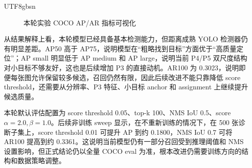 \documentclass[11pt,a4paper]{article}
\begin{document}
\begin{CJK*}{UTF8}{gbsn}
\begin{figure}[H]
\centering
{}
\caption{本轮实验 COCO AP/AR 指标可视化}
\end{figure}

从结果解释上看，本轮模型已经具备基本检测能力，但距离成熟 YOLO 检测器仍有明显差距。AP50 高于 AP75，说明模型在“粗略找到目标”方面优于“高质量定位”；AP small 明显低于 AP medium 和 AP large，说明当前 P4/P5 双尺度结构对小目标不够友好，这也是后续增加 P3 的直接动机。AR100 为 0.3023，说明即便每张图允许保留较多候选，召回仍然有限，因此后续改进不能只靠降低 score threshold，还需要从分辨率、P3 特征、小目标 anchor 和 assignment 上继续提升候选质量。

本轮默认评估配置为 score threshold 0.05、top-k 100、NMS IoU 0.5、score $\alpha=2.0,\beta=1.0$。后续非训练 sweep 显示，在不重新训练的情况下，在 500 张诊断子集上，score threshold 0.01 可提升 AP 到约 0.1800，NMS IoU 0.7 可将 AR100 提高到约 0.3361。这说明当前模型仍有一部分召回受到推理阈值和 NMS 设置影响，但正式结论仍以全量 COCO eval 为准，根本改进仍需要训练方向的结构和数据策略调整。

\end{CJK*}
\end{document}
